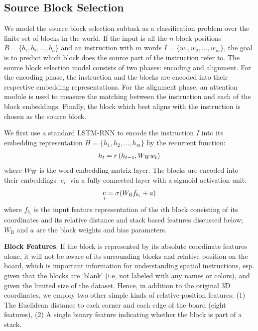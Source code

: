 \documentclass[letterpaper]{article} %
\DeclareMathOperator{\embb}{c}
\begin{document}
\subsection{Source Block Selection} \label{source}
We model the source block selection subtask as a classification problem over the finite set of blocks in the world. 
If the input is all the $n$ block positions $B = \{b_1, b_2, \ldots, b_n\}$ and an instruction with $m$ words $I=\{w_1, w_2, \ldots, w_m\}$, the goal is to predict which block does the source part of the instruction refer to. 
%
The source block selection model consists of two phases: encoding and alignment. For the encoding phase, the instruction and the blocks are encoded into their respective embedding representations. For the alignment phase, an attention module is used to measure the matching between the instruction and each of the block embeddings. Finally, the block which best aligns with the instruction is chosen as the source block.

We first use a standard LSTM-RNN to encode the instruction $I$ into its embedding representation $H = \{h_1, h_2, \ldots, h_m\}$ by the recurrent function:
\begin{equation}
h_t = r\left( h_{t-1}, W_{\textsc{W}} w_t \right)
\end{equation}
where $W_{\textsc{W}}$ is the word embedding matrix layer.
The blocks are encoded into their embeddings $\embb_i$ via a fully-connected layer with a sigmoid activation unit:
\begin{equation}
\embb_i = \sigma(W_\textsc{B} f_{b_i} + a)
%
\end{equation}
where $f_{b_i}$ is the input feature representation of the $i$th block consisting of its coordinates and its relative distance and stack based features discussed below; $W_\text{B}$ and $a$ are the block weights and bias parameters.

\textbf{Block Features}:
If the block is represented by its absolute coordinate features alone, it will not be aware of its surrounding blocks and relative position on the board, which is important information for understanding spatial instructions, esp. given that the blocks are `blank' (i.e, not labeled with any names or colors), and given the limited size of the dataset. Hence, in addition to the original 3D coordinates, we employ two other simple kinds of relative-position features: (1) The Euclidean distance to each corner and each edge of the board (eight features), (2) A single binary feature indicating whether the block is part of a stack. 
\end{document}
